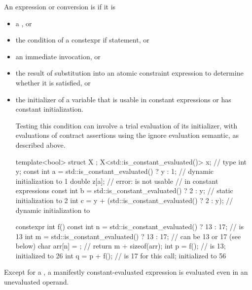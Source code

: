 \pnum
An expression or conversion is 
if it is
\begin{itemize}
\item a , or
\item the condition of a constexpr if statement, or
\item an immediate invocation, or
\item the result of substitution into an atomic constraint expression
to determine whether it is satisfied, or
\item the initializer of a variable
that is usable in constant expressions or
has constant initialization.
\begin{footnote}
Testing this condition
can involve a trial evaluation of its initializer,
with evaluations of contract assertions
using the ignore evaluation semantic,
as described above.
\end{footnote}
\begin{example}
\begin{codeblock}
template<bool> struct X {};
X<std::is_constant_evaluated()> x;                      // type 
int y;
const int a = std::is_constant_evaluated() ? y : 1;     // dynamic initialization to 1
double z[a];                                            // error:  is not usable
                                                        // in constant expressions
const int b = std::is_constant_evaluated() ? 2 : y;     // static initialization to 2
int c = y + (std::is_constant_evaluated() ? 2 : y);     // dynamic initialization to 

constexpr int f() {
  const int n = std::is_constant_evaluated() ? 13 : 17; //  is 13
  int m = std::is_constant_evaluated() ? 13 : 17;       //  can be 13 or 17 (see below)
  char arr[n] = {};                                     // 
  return m + sizeof(arr);
}
int p = f();                                            //  is 13; initialized to 26
int q = p + f();                                        //  is 17 for this call; initialized to 56
\end{codeblock}
\end{example}
\end{itemize}
\begin{note}
Except for a ,
a manifestly constant-evaluated expression
is evaluated even in an unevaluated operand.
\end{note}

